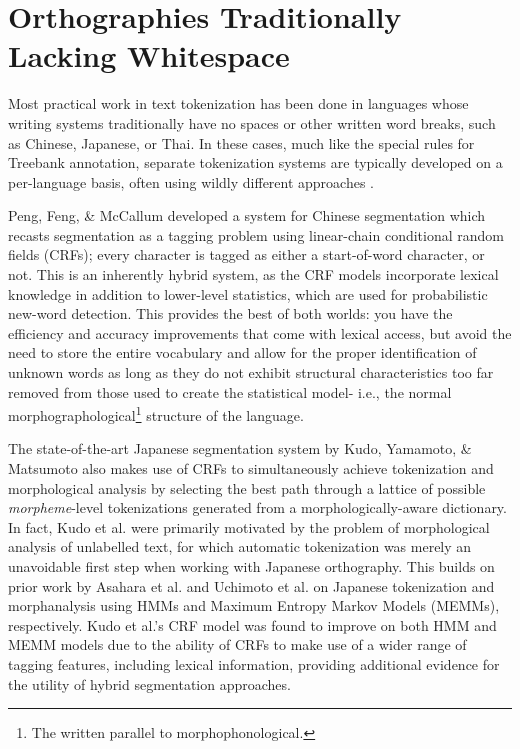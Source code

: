 \section{Orthographies Traditionally Lacking Whitespace}
Most practical work in text tokenization has been done in languages whose writing systems traditionally have no spaces or other written word breaks, such as Chinese, Japanese, or Thai. In these cases, much like the special rules for Treebank annotation, separate tokenization systems are typically developed on a per-language basis, often using wildly different approaches \cite{peng04} \cite{suzuki00}.

Peng, Feng, \& McCallum\cite{peng04} developed a system for Chinese segmentation which recasts segmentation as a tagging problem using linear-chain conditional random fields (CRFs); every character is tagged as either a start-of-word character, or not. This is an inherently hybrid system, as the CRF models incorporate lexical knowledge in addition to lower-level statistics, which are used for probabilistic new-word detection. This provides the best of both worlds: you have the efficiency and accuracy improvements that come with lexical access, but avoid the need to store the entire vocabulary and allow for the proper identification of unknown words as long as they do not exhibit structural characteristics too far removed from those used to create the statistical model- i.e., the normal morphographological\footnote{The written parallel to morphophonological.} structure of the language.

The state-of-the-art Japanese segmentation system by Kudo, Yamamoto, \& Matsumoto\cite{kudo04} also makes use of CRFs to simultaneously achieve tokenization and morphological analysis by selecting the best path through a lattice of possible \textit{morpheme}-level tokenizations generated from a morphologically-aware dictionary. In fact, Kudo et al. were primarily motivated by the problem of morphological analysis of unlabelled text, for which automatic tokenization was merely an unavoidable first step when working with Japanese orthography. This builds on prior work by Asahara et al.\cite{asahara00} and Uchimoto et al.\cite{uchimoto01} on Japanese tokenization and morphanalysis using HMMs and Maximum Entropy Markov Models (MEMMs), respectively. Kudo et al.'s CRF model was found to improve on both HMM and MEMM models due to the ability of CRFs to make use of a wider range of tagging features, including lexical information, providing additional evidence for the utility of hybrid segmentation approaches.


